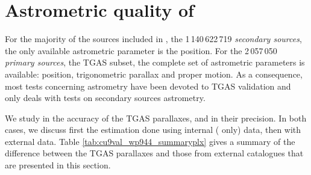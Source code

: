 
\section{Astrometric quality of {}}\label{astroqual}

For the majority of the sources included in {}, the 1\,140\,622\,719 {\it secondary sources}, the only available astrometric parameter is the position. 
For the 2\,057\,050 {\it primary sources}, the TGAS subset, the complete set of astrometric parameters is available: position, trigonometric parallax and proper motion. 
As a consequence, most tests concerning astrometry have been devoted to TGAS validation and only  deals with tests on secondary sources astrometry.

We study in  the accuracy of the TGAS parallaxes, and in  their precision. 
In both cases, we discuss first the estimation done using internal ({\gaia} only) data, then with external data.
Table \ref{tab:cu9val_wp944_summaryplx} gives a summary of the difference between the TGAS parallaxes and those from external catalogues that are presented in this section. 

